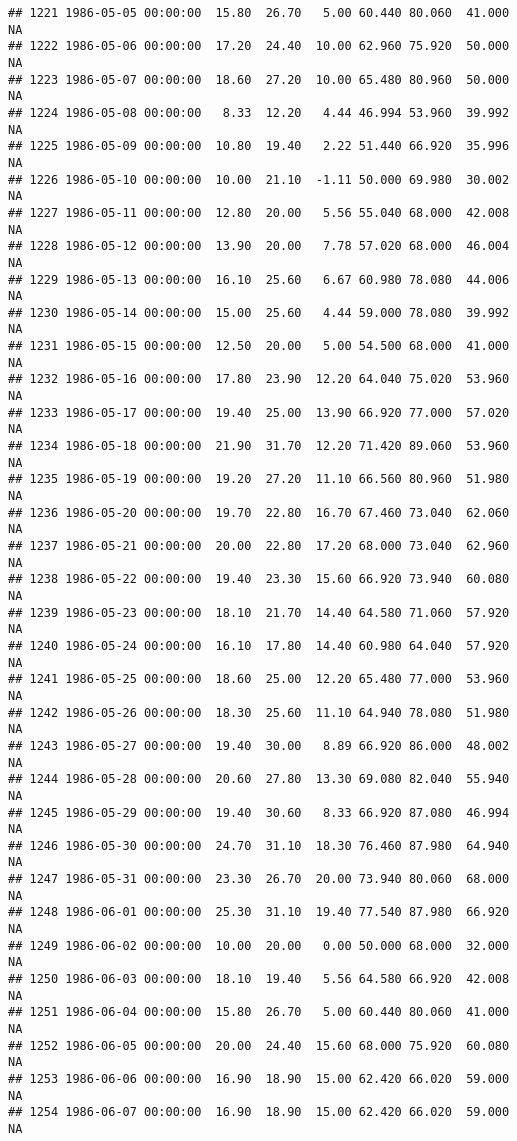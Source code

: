 \documentclass{article}\usepackage{graphicx, color}
\makeatletter
\newenvironment{kframe}{%
 \def\at@end@of@kframe{}%
 \ifinner\ifhmode%
  \def\at@end@of@kframe{\end{minipage}}%
  \begin{minipage}{\columnwidth}%
 \fi\fi%
 \def\FrameCommand##1{\hskip\@totalleftmargin \hskip-\fboxsep
 \colorbox{shadecolor}{##1}\hskip-\fboxsep
     \hskip-\linewidth \hskip-\@totalleftmargin \hskip\columnwidth}%
 \MakeFramed {\advance\hsize-\width
   \@totalleftmargin\z@ \linewidth\hsize
   \@setminipage}}%
 {\par\unskip\endMakeFramed%
 \at@end@of@kframe}
\newenvironment{knitrout}{}{} %
\makeatother
\begin{document}
\begin{knitrout}
\begin{kframe}
\begin{verbatim}
## 1221 1986-05-05 00:00:00  15.80  26.70   5.00 60.440 80.060  41.000     NA
## 1222 1986-05-06 00:00:00  17.20  24.40  10.00 62.960 75.920  50.000     NA
## 1223 1986-05-07 00:00:00  18.60  27.20  10.00 65.480 80.960  50.000     NA
## 1224 1986-05-08 00:00:00   8.33  12.20   4.44 46.994 53.960  39.992     NA
## 1225 1986-05-09 00:00:00  10.80  19.40   2.22 51.440 66.920  35.996     NA
## 1226 1986-05-10 00:00:00  10.00  21.10  -1.11 50.000 69.980  30.002     NA
## 1227 1986-05-11 00:00:00  12.80  20.00   5.56 55.040 68.000  42.008     NA
## 1228 1986-05-12 00:00:00  13.90  20.00   7.78 57.020 68.000  46.004     NA
## 1229 1986-05-13 00:00:00  16.10  25.60   6.67 60.980 78.080  44.006     NA
## 1230 1986-05-14 00:00:00  15.00  25.60   4.44 59.000 78.080  39.992     NA
## 1231 1986-05-15 00:00:00  12.50  20.00   5.00 54.500 68.000  41.000     NA
## 1232 1986-05-16 00:00:00  17.80  23.90  12.20 64.040 75.020  53.960     NA
## 1233 1986-05-17 00:00:00  19.40  25.00  13.90 66.920 77.000  57.020     NA
## 1234 1986-05-18 00:00:00  21.90  31.70  12.20 71.420 89.060  53.960     NA
## 1235 1986-05-19 00:00:00  19.20  27.20  11.10 66.560 80.960  51.980     NA
## 1236 1986-05-20 00:00:00  19.70  22.80  16.70 67.460 73.040  62.060     NA
## 1237 1986-05-21 00:00:00  20.00  22.80  17.20 68.000 73.040  62.960     NA
## 1238 1986-05-22 00:00:00  19.40  23.30  15.60 66.920 73.940  60.080     NA
## 1239 1986-05-23 00:00:00  18.10  21.70  14.40 64.580 71.060  57.920     NA
## 1240 1986-05-24 00:00:00  16.10  17.80  14.40 60.980 64.040  57.920     NA
## 1241 1986-05-25 00:00:00  18.60  25.00  12.20 65.480 77.000  53.960     NA
## 1242 1986-05-26 00:00:00  18.30  25.60  11.10 64.940 78.080  51.980     NA
## 1243 1986-05-27 00:00:00  19.40  30.00   8.89 66.920 86.000  48.002     NA
## 1244 1986-05-28 00:00:00  20.60  27.80  13.30 69.080 82.040  55.940     NA
## 1245 1986-05-29 00:00:00  19.40  30.60   8.33 66.920 87.080  46.994     NA
## 1246 1986-05-30 00:00:00  24.70  31.10  18.30 76.460 87.980  64.940     NA
## 1247 1986-05-31 00:00:00  23.30  26.70  20.00 73.940 80.060  68.000     NA
## 1248 1986-06-01 00:00:00  25.30  31.10  19.40 77.540 87.980  66.920     NA
## 1249 1986-06-02 00:00:00  10.00  20.00   0.00 50.000 68.000  32.000     NA
## 1250 1986-06-03 00:00:00  18.10  19.40   5.56 64.580 66.920  42.008     NA
## 1251 1986-06-04 00:00:00  15.80  26.70   5.00 60.440 80.060  41.000     NA
## 1252 1986-06-05 00:00:00  20.00  24.40  15.60 68.000 75.920  60.080     NA
## 1253 1986-06-06 00:00:00  16.90  18.90  15.00 62.420 66.020  59.000     NA
## 1254 1986-06-07 00:00:00  16.90  18.90  15.00 62.420 66.020  59.000     NA

\end{verbatim}
\end{kframe}
\end{knitrout}
\end{document}
